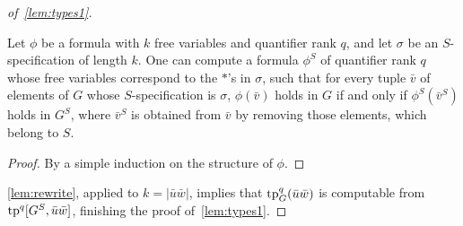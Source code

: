 \begin{proof}[of~\cref{lem:types1}]
\begin{lemma}\label{lem:rewrite}
  Let $\phi$ be a formula
  with $k$ free variables and quantifier rank $q$, 
  and let $\sigma$ be an $S$-specification of length $k$.
  One can compute a formula $\phi^S$ of quantifier rank $q$
  whose free variables correspond to the $\ast$'s in $\sigma$,
  such that for every tuple $\bar v$ of elements of $G$
  whose $S$-specification is $\sigma$,
   $\phi(\bar v)$ holds in $G$
  if and only if $\phi^S(\bar v^S)$ holds in $G^S$, where $\bar v^S$ is obtained from $\bar v$ by removing 
  those elements, which belong to $S$.
\end{lemma}
\begin{proof}\label{pf:}
By a simple induction on the structure of $\phi$.
\end{proof}
%
%

\cref{lem:rewrite}, applied to $k=|\bar u\bar w|$, implies that 
$\mathrm{tp}^q_G(\bar u\bar w)$ is computable from
	$\mathrm{tp}^q[G^S, \bar u\bar w]$, finishing the proof of~\cref{lem:types1}.	
\end{proof}


